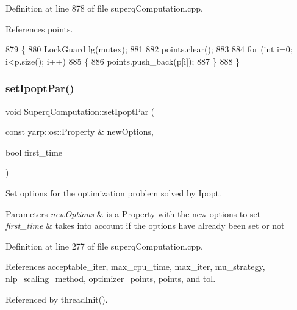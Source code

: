 Definition at line 878 of file superq\+Computation.\+cpp.



References points.


\begin{DoxyCode}
879 \{
880     LockGuard lg(mutex);
881 
882     points.clear();
883 
884     \textcolor{keywordflow}{for} (\textcolor{keywordtype}{int} i=0; i<p.size(); i++)
885     \{
886         points.push\_back(p[i]);
887     \}
888 \}
\end{DoxyCode}
\mbox{\label{classSuperqComputation_afa65ce67fb294f38c4e843540f96de3c}} 
\subsubsection{\texorpdfstring{set\+Ipopt\+Par()}{setIpoptPar()}}
{\footnotesize\ttfamily void Superq\+Computation\+::set\+Ipopt\+Par (\begin{DoxyParamCaption}\item[{const yarp\+::os\+::\+Property \&}]{new\+Options,  }\item[{bool}]{first\+\_\+time }\end{DoxyParamCaption})}



Set options for the optimization problem solved by Ipopt. 


\begin{DoxyParams}{Parameters}
{\em new\+Options} & is a Property with the new options to set \\
\hline
{\em first\+\_\+time} & takes into account if the options have already been set or not \\
\hline
\end{DoxyParams}


Definition at line 277 of file superq\+Computation.\+cpp.



References acceptable\+\_\+iter, max\+\_\+cpu\+\_\+time, max\+\_\+iter, mu\+\_\+strategy, nlp\+\_\+scaling\+\_\+method, optimizer\+\_\+points, points, and tol.



Referenced by thread\+Init().


